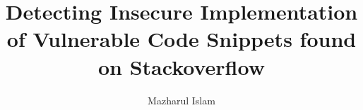 \documentclass[sigconf]{acmart}
\begin{document}
\title{Detecting Insecure Implementation of Vulnerable Code Snippets found on Stackoverflow}
\author{Mazharul Islam}
  
\maketitle



      








\end{document}

